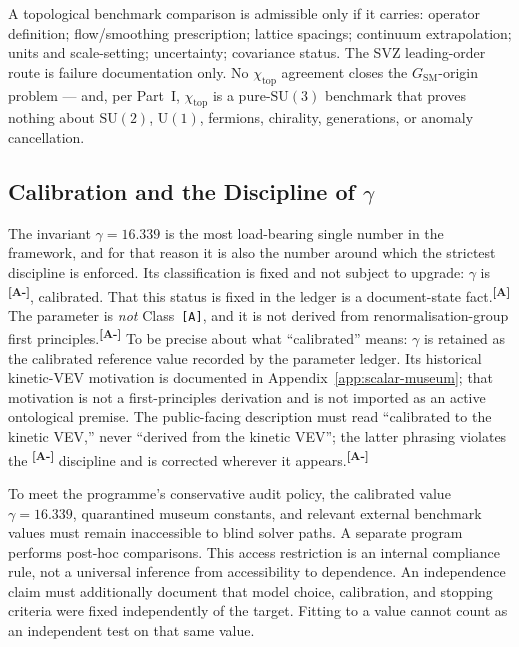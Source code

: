 \documentclass[12pt,a4paper,twoside]{article}
\theoremstyle{plain}
\theoremstyle{definition}
\theoremstyle{remark}
\newcommand{\catmark}[1]{\textsuperscript{\textsf{\textbf{[#1]}}}}
\newcommand{\GammaGeom}{16.339} %
\begin{document}
\begin{governancebox}
A topological benchmark comparison is admissible only if it carries:
operator definition; flow/smoothing prescription; lattice spacings;
continuum extrapolation; units and scale-setting; uncertainty;
covariance status. The SVZ leading-order route is failure documentation
only. No $\chi_{\mathrm{top}}$ agreement closes the
$G_{\mathrm{SM}}$-origin problem --- and, per Part~I, $\chi_{\mathrm{top}}$
is a pure-$\mathrm{SU}(3)$ benchmark that proves nothing about
$\mathrm{SU}(2)$, $\mathrm{U}(1)$, fermions, chirality, generations, or
anomaly cancellation.
\end{governancebox}

\subsection{Calibration and the Discipline of \texorpdfstring{$\gamma$}{gamma}}
\label{subsec:gamma-discipline}

The invariant $\gamma = \GammaGeom$ is the most load-bearing single
number in the framework, and for that reason it is also the number
around which the strictest discipline is enforced. Its classification is
fixed and not subject to upgrade: $\gamma$ is \catmark{A-}, calibrated.
That this status is fixed in the ledger is a document-state fact.\catmark{A}
The parameter is \emph{not} Class~\texttt{[A]}, and it is not derived from
renormalisation-group first principles.\catmark{A-} To be precise about
what ``calibrated'' means: $\gamma$ is retained as the calibrated reference value recorded by the parameter ledger.
Its historical kinetic-VEV motivation is documented in Appendix~\ref{app:scalar-museum};
that motivation is not a first-principles derivation and is not imported as
an active ontological premise. The public-facing
description must read ``calibrated to the kinetic VEV,'' never ``derived
from the kinetic VEV''; the latter phrasing violates the \catmark{A-}
discipline and is corrected wherever it appears.\catmark{A-}

\begin{governancebox}
To meet the programme's conservative audit policy, the calibrated value
$\gamma=16.339$, quarantined museum constants, and relevant external benchmark
values must remain inaccessible to blind solver paths. A separate program
performs post-hoc comparisons. This access restriction is an internal
compliance rule, not a universal inference from accessibility to dependence.
An independence claim must additionally document that model choice,
calibration, and stopping criteria were fixed independently of the target.
Fitting to a value cannot count as an independent test on that same value.
\end{governancebox}
\end{document}
